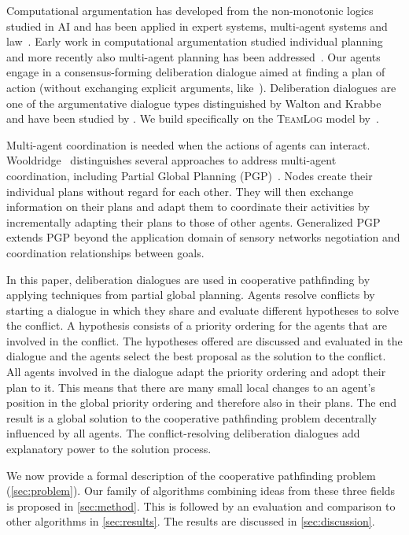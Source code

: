 Computational argumentation has developed from the non-monotonic logics studied 
in AI and has been applied in expert 
systems, multi-agent systems and 
law~\cite{vanEemerenEtal2014ch11,baroniEtal2018}. Early work in 
computational argumentation studied individual planning~\cite{pollock1995} and 
more recently also multi-agent planning has been 
addressed~\cite{ferrando2012,pardo2011}. Our agents engage in a 
consensus-forming deliberation
dialogue aimed at finding a plan of action (without exchanging explicit 
arguments, like~\cite{black2011}). Deliberation dialogues are one of 
the argumentative dialogue types distinguished by Walton and 
Krabbe~\cite{walton1995} and have been studied by 
\cite{mcburney2007,walton2014}. We build specifically on the \textsc{TeamLog} 
model by~\cite{dunin-keplicz2011}.

Multi-agent coordination is needed when the actions of agents can interact.
Wooldridge~\cite[pp.~202--204]{wooldridge2009} distinguishes several 
approaches to address multi-agent coordination, including Partial Global 
Planning (PGP)~\cite{durfee1991}. Nodes create their individual plans without 
regard for each other. They will then exchange information on their plans and
adapt them to coordinate their activities by incrementally 
adapting their plans to those of other agents.
Generalized PGP \cite{decker1992} extends PGP beyond the application domain of sensory networks %
negotiation and coordination relationships between goals. 

In this paper, deliberation dialogues are used in cooperative pathfinding by applying techniques from
partial global planning. Agents resolve conflicts by starting a dialogue in
which they share and evaluate different hypotheses to solve the conflict. A
hypothesis consists of a priority ordering for the agents that are involved in
the conflict. The hypotheses offered are discussed and evaluated in the
dialogue and the agents select the best proposal as the solution
to the conflict. All agents involved in the dialogue adapt the priority
ordering and adopt their plan to it. This means that there are many small local
changes to an agent's position in the global priority ordering and therefore also in
their plans. The end result is a global solution to the cooperative pathfinding
problem decentrally influenced by all agents. The conflict-resolving deliberation dialogues add explanatory power to the solution process.

We now provide a formal description of the cooperative pathfinding problem 
(\autoref{sec:problem}). Our family 
of algorithms combining ideas from these three fields is proposed in 
\autoref{sec:method}. This is followed by an evaluation and comparison to other 
algorithms in \autoref{sec:results}. The results are discussed in 
\autoref{sec:discussion}.
